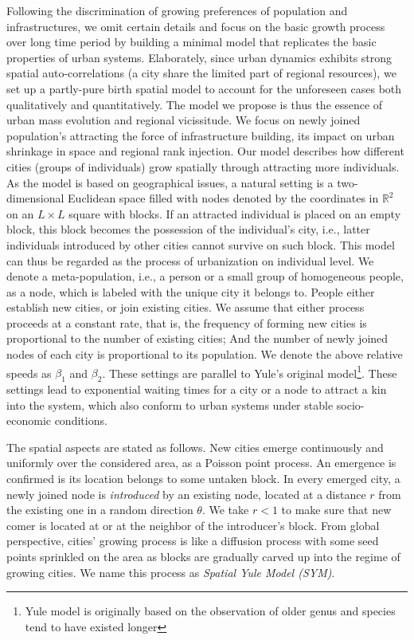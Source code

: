 \documentclass[reprint,unsortedaddress,amsmath,amssymb,aps,prl,showkeys]{revtex4-2}
\begin{document}
Following the discrimination of growing preferences of population and infrastructures, we omit certain details and focus on the basic growth process over long time period by building a minimal model that replicates the basic properties of urban systems. Elaborately, since urban dynamics exhibits strong spatial auto-correlations (a city share the limited part of regional resources), we set up a partly-pure birth spatial model to account for the unforeseen cases both qualitatively and quantitatively. The model we propose is thus the essence of urban mass evolution and regional vicissitude. We focus on newly joined population's attracting the force of infrastructure building, its impact on urban shrinkage in space and regional rank injection. 
Our model describes how different cities (groups of individuals) grow spatially through attracting more individuals. As the model is based on geographical issues, a natural setting is a two-dimensional Euclidean space filled with nodes denoted by the coordinates in $\mathbb{R}^2$ on an $L\times L$ square with blocks. If an attracted individual is placed on an empty block, this block becomes the possession of the individual's city, i.e., latter individuals introduced by other cities cannot survive on such block. This model can thus be regarded as the process of urbanization on individual level. We denote a meta-population, i.e., a person or a small group of homogeneous people, as a node, which is labeled with the unique city it belongs to. People either establish new cities, or join existing cities. We assume that either process proceeds at a constant rate, that is, the frequency of forming new cities is proportional to the number of existing cities; And the number of newly joined nodes of each city is proportional to its population. We denote the above relative speeds as $\beta_1$ and $\beta_2$. These settings are parallel to Yule's original model\cite{yule1925ii}\footnote{Yule model is originally based on the observation of older genus and species tend to have existed longer}. These settings lead to exponential waiting times for a city or a node to attract a kin into the system, which also conform to urban systems under stable socio-economic conditions. 


The spatial aspects are stated as follows. New cities emerge continuously and uniformly over the considered area, as a Poisson point process\cite{miles1970homogeneous}. An emergence is confirmed is its location belongs to some untaken block. In every emerged city, a newly joined node is \emph{introduced} by an existing node, located at a distance $r$ from the existing one in a random direction $\theta$. We take $r < 1$ to make sure that new comer is located at or at the neighbor of the introducer's block. From global perspective, cities' growing process is like a diffusion process\cite{RevModPhys.87.925} with some seed points sprinkled on the area as blocks are gradually carved up into the regime of growing cities. We name this process as \emph{Spatial Yule Model (SYM)}.
\end{document}
